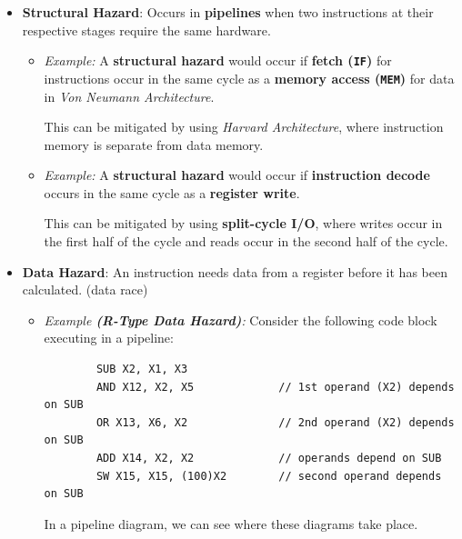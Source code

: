 \documentclass[12pt, letterpaper]{article}
\begin{document}
\begin{itemize}
  \item \textbf{Structural Hazard}: Occurs in \textbf{pipelines} when
    two instructions at their respective stages require the same hardware.
    \begin{itemize}
      \item \textit{Example:} A \textbf{structural hazard} would
        occur if \textbf{fetch (\texttt{IF})} for instructions occur
        in the same cycle as a \textbf{memory access (\texttt{MEM})}
        for data in \textit{Von Neumann Architecture}.
        \medskip

        This can be mitigated by using \textit{Harvard Architecture},
        where instruction memory is separate from data memory.

      \item \textit{Example:} A \textbf{structural hazard} would
        occur if \textbf{instruction decode} occurs in the same cycle
        as a \textbf{register write}.
        \medskip

        This can be mitigated by using \textbf{split-cycle I/O},
        where writes occur in the first half of the cycle and reads
        occur in the second half of the cycle.
    \end{itemize}
  \item \textbf{Data Hazard}: An instruction needs data from a
    register before it has been calculated. (data race)
    \begin{itemize}
      \item \textit{Example \textbf{(R-Type Data Hazard)}:} Consider
        the following code block executing in a pipeline:
                \begin{verbatim}
        SUB X2, X1, X3
        AND X12, X2, X5             // 1st operand (X2) depends on SUB
        OR X13, X6, X2              // 2nd operand (X2) depends on SUB
        ADD X14, X2, X2             // operands depend on SUB
        SW X15, X15, (100)X2        // second operand depends on SUB
                \end{verbatim}

        In a pipeline diagram, we can see where these diagrams take place.

        \medskip
        {\centering

}
\end{itemize}
\end{itemize}
\end{document}
